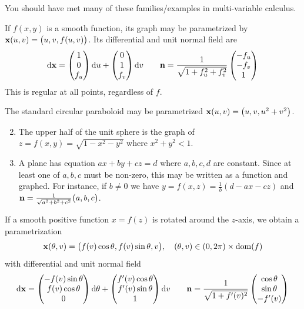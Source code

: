 
You should have met many of these families/examples in multi-variable calculus.

 If $f(x,y)$ is a smooth function, its graph may be parametrized by ${\mathbf{x}}(u,v)=\bigl(u,v,f(u,v)\bigr)$. Its differential and unit normal field are
	\[\mathrm{d}{\mathbf{x}}=\begin{pmatrix}1\\0\\f_u\end{pmatrix}{\mathrm{d}u}+\begin{pmatrix}0\\1\\f_v\end{pmatrix}{\mathrm{d}v}\qquad {\mathbf{n}}=\frac 1{\sqrt{1+f_u^2+f_v^2}}\begin{pmatrix}-f_u\\-f_v\\1\end{pmatrix}\]
	This is regular at all points, regardless of $f$.


\begin{examples}{}{}
\exstart The standard circular paraboloid may be parametrized ${\mathbf{x}}(u,v)=\bigl(u,v,u^2+v^2\bigr)$.
\begin{enumerate}\setcounter{enumi}{1}
  \item The upper half of the unit sphere is the graph of $z=f(x,y)=\sqrt{1-x^2-y^2}$ where $x^2+y^2<1$.
  \item A plane has equation $ax+by+cz=d$ where $a,b,c,d$ are constant. Since at least one of $a,b,c$ must be non-zero, this may be written as a function and graphed. For instance, if $b\neq 0$ we have $y=f(x,z)=\frac 1b(d-ax-cz)$ and ${\mathbf{n}}=\frac 1{\sqrt{a^2+b^2+c^2}}\bigl(a,b,c\bigr)$.
\end{enumerate}
\end{examples}

 If a smooth positive function $x=f(z)$ is rotated around the $z$-axis, we obtain a parametrization
	\[{\mathbf{x}}(\theta,v)=\bigl(f(v)\cos\theta,f(v)\sin\theta,v\bigr),\quad (\theta,v)\in(0,2\pi)\times\operatorname{dom}(f)\]
	with differential and unit normal field
	\begin{gather*}
		\mathrm{d}{\mathbf{x}}=\begin{pmatrix}-f(v)\sin\theta\\f(v)\cos\theta\\0\end{pmatrix}{\mathrm{d}\theta}+\begin{pmatrix}f'(v)\cos\theta\\f'(v)\sin\theta\\1\end{pmatrix}{\mathrm{d}v}\qquad {\mathbf{n}}=\frac 1{\sqrt{1+f'(v)^2}}\begin{pmatrix}\cos\theta\\\sin\theta\\-f'(v)\end{pmatrix}
	\end{gather*}

